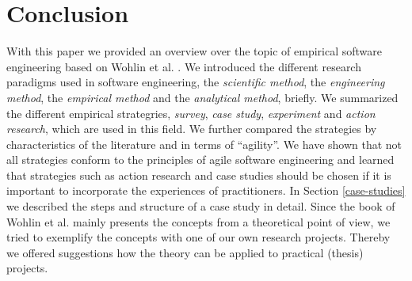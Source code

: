 \documentclass[runningheads]{llncs}
\begin{document}
\section{Conclusion}
With this paper we provided an overview over the topic of empirical software engineering based on Wohlin et al. \cite{Wohlin:2012:ESE:2349018}. We introduced the different research paradigms used in software engineering, the \textit{scientific method}, the \textit{engineering method}, the \textit{empirical method} and the \textit{analytical method}, briefly. We summarized the different empirical strategries, \textit{survey}, \textit{case study}, \textit{experiment} and \textit{action research}, which are used in this field. We further compared the strategies by characteristics of the literature and in terms of ``agility''. We have shown that not all strategies conform to the principles of agile software engineering and learned that strategies such as action research and case studies should be chosen if it is important to incorporate the experiences of practitioners. In Section \ref{case-studies} we described the steps and structure of a case study in detail. Since the book of Wohlin et al. \cite{Wohlin:2012:ESE:2349018} mainly presents the concepts from a theoretical point of view, we tried to exemplify the concepts with one of our own research projects. Thereby we offered suggestions how the theory can be applied to practical (thesis) projects.



\end{document}
